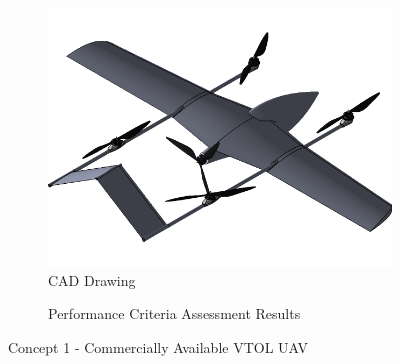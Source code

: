 \begin{figure}[H]
\centering
\begin{subfigure}[t]{.5\textwidth}
  \centering
  \includegraphics[width=0.85\linewidth]{Concepts/CAD/1cad.png}
  \vspace{0.125cm}
  \caption{CAD Drawing}
  \label{fig:cad1}
\end{subfigure}%
\begin{subfigure}[t]{.5\textwidth}
  \centering
  \caption{Performance Criteria Assessment Results}
  \label{fig:radar1}
\end{subfigure}
\caption{Concept 1 - Commercially Available VTOL UAV}
\label{fig:concept1}
\end{figure}


